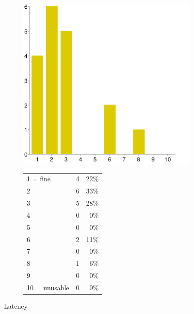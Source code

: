 \documentclass[MSc,paper=a4,pagesize=auto]{icldt}
\begin{document}
\begin{figure}[htbp!]
\centering
\begin{subfigure}{0.4\textwidth}
    \centering
    \includegraphics[width=1\linewidth]{resources/10-latency}
\end{subfigure}%
\centering
\begin{subfigure}{\textwidth}
    \centering
   	\begin{tabular}{ l c r }
1 = fine&4&22\% \\
2&6&33\% \\
3&5&28\% \\
4&0&0\% \\
5&0&0\% \\
6&2&11\% \\
7&0&0\% \\
8&1&6\% \\
9&0&0\% \\
10 = unusable&0&0\% \\
\end{tabular}
\end{subfigure} 
    \caption{Latency}
    \label{fig:10-latency}
\end{figure}
\end{document}
